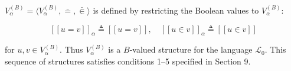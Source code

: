$V_{\alpha}^{(B)} = \langle V_{\alpha}^{(B)}, \bar{=}, \bar{\in} \rangle$ is defined by restricting the Boolean values to $V_{\alpha}^{(B)}$:

$$[\![u = v]\!]_{\alpha} \triangleq [\![u = v]\!], \quad [\![u \in v]\!]_{\alpha} \triangleq [\![u \in v]\!]$$

for $u, v \in V_{\alpha}^{(B)}$. Thus $V_{\alpha}^{(B)}$ is a $B$-valued structure for the language $\mathcal{L}_0$. This sequence of structures satisfies conditions 1--5 specified in Section 9.
